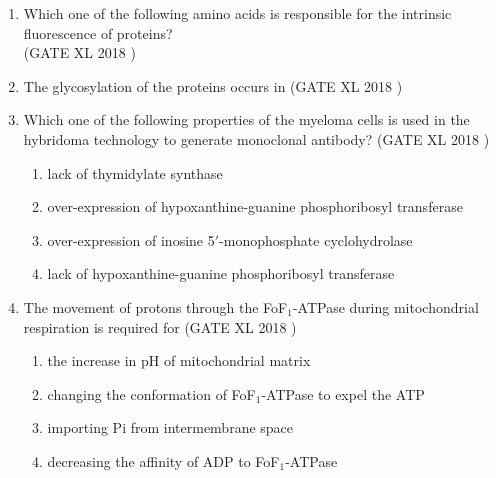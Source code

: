 \documentclass[14pt]{extarticle}
\begin{document}
\begin{flushleft}
\begin{enumerate}[leftmargin=*]
\item Which one of the following amino acids is responsible for the intrinsic fluorescence of proteins?\\
\hfill(GATE XL 2018 )\\
\begin{enumerate}
\end{enumerate}
\item The glycosylation of the proteins occurs in
\hfill(GATE XL 2018 )\\
\begin{enumerate}
\end{enumerate}


\item Which one of the following properties of the myeloma cells is used in the hybridoma technology to generate monoclonal antibody?
\hfill(GATE XL 2018 )\\
\begin{enumerate}
    \item lack of thymidylate synthase
    \item over-expression of hypoxanthine-guanine phosphoribosyl transferase
    \item over-expression of inosine 5$'$-monophosphate cyclohydrolase
    \item lack of hypoxanthine-guanine phosphoribosyl transferase
\end{enumerate}


\item The movement of protons through the FoF$_1$-ATPase during mitochondrial respiration is required for
\hfill(GATE XL 2018 )\\
\begin{enumerate}
    \item the increase in pH of mitochondrial matrix
    \item changing the conformation of FoF$_1$-ATPase to expel the ATP
    \item importing Pi from intermembrane space
    \item decreasing the affinity of ADP to FoF$_1$-ATPase
\end{enumerate}



\end{enumerate}
\end{flushleft}
\end{document}

